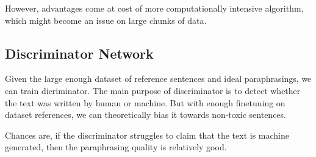However, advantages come at cost of more computationally intensive algorithm,
which might become an issue on large chunks of data.

\subsection{Discriminator Network}

Given the large enough dataset of reference sentences and ideal paraphrasings,
we can train dicriminator. The main purpose of discriminator is to detect
whether the text was written by human or machine. But with enough finetuning on
dataset references, we can theoretically bias it towards non-toxic sentences.

Chances are, if the discriminator struggles to claim that the text is machine
generated, then the paraphrasing quality is relatively good.